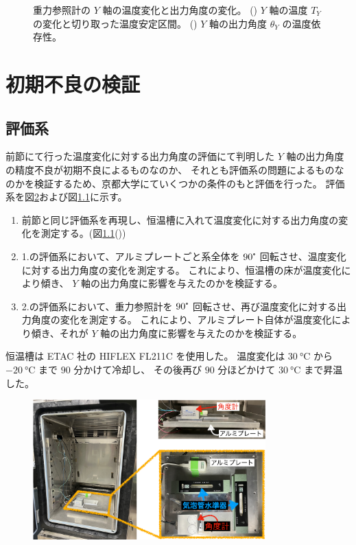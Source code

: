 \documentclass[../../main.tex]{subfiles}
\begin{document}
\begin{figure}[H]
\begin{minipage}[b]{0.45\columnwidth}
        \subcaption{}
        \label{fig:angleY_temp_dep}
    \end{minipage}
    \caption{重力参照計の $Y$ 軸の温度変化と出力角度の変化。
             () $Y$ 軸の温度 $T_{Y}$ の変化と切り取った温度安定区間。
             () $Y$ 軸の出力角度 $\theta_{Y}$ の温度依存性。}
    \label{fig:evaluation_bath_Yaxis}
\end{figure}
\section{初期不良の検証}
\subsection{評価系}
前節にて行った温度変化に対する出力角度の評価にて判明した $Y$ 軸の出力角度の精度不良が初期不良によるものなのか、
それとも評価系の問題によるものなのかを検証するため、京都大学にていくつかの条件のもと評価を行った。
評価系を図\ref{fig:evaluation_system_kyoto}および図\ref{}に示す。
\begin{enumerate}
    \item 前節と同じ評価系を再現し、恒温槽に入れて温度変化に対する出力角度の変化を測定する。(図\ref{}(\subref{}))
    \item 1.の評価系において、アルミプレートごと系全体を $90\tcdegree$ 回転させ、温度変化に対する出力角度の変化を測定する。
          これにより、恒温槽の床が温度変化により傾き、 $Y$ 軸の出力角度に影響を与えたのかを検証する。
    \item 2.の評価系において、重力参照計を $90\tcdegree$ 回転させ、再び温度変化に対する出力角度の変化を測定する。
          これにより、アルミプレート自体が温度変化により傾き、それが $Y$ 軸の出力角度に影響を与えたのかを検証する。
\end{enumerate}
恒温槽は ETAC 社の HIFLEX FL211C を使用した。
温度変化は $\SI{30}{\degreeCelsius}$ から $\SI{-20}{\degreeCelsius}$ まで $90$ 分かけて冷却し、
その後再び $90$ 分ほどかけて $\SI{30}{\degreeCelsius}$ まで昇温した。
\begin{figure}[H]
    \centering
    \includegraphics[width=0.8\textwidth]{tiltsensor/evaluation_system_kyoto.pdf}
    \label{fig:evaluation_system_kyoto}
\end{figure}
\end{document}
